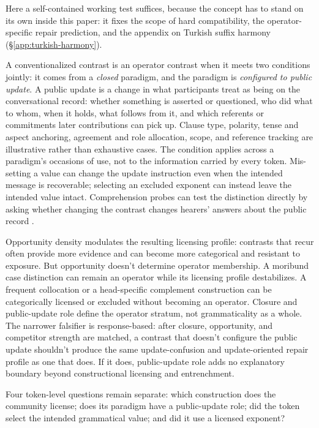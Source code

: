 \documentclass[12pt,letterpaper]{article}
\begin{document}
Here a self-contained working test suffices, because the concept has to stand on its own inside this paper: it fixes the scope of hard compatibility, the operator-specific repair prediction, and the appendix on Turkish suffix harmony (\S\ref{app:turkish-harmony}).

A conventionalized contrast is an operator contrast when it meets two
conditions jointly: it comes from a \emph{closed} paradigm, and the paradigm is \emph{configured to
public update}. A public update is a change in what participants treat as being
on the conversational record: whether something is asserted or questioned, who
did what to whom, when it holds, what follows from it, and which referents or
commitments later contributions can pick up. Clause type, polarity, tense and
aspect anchoring, agreement and role allocation, scope, and reference tracking
are illustrative rather than exhaustive cases. The condition applies across a
paradigm's occasions of use, not to the information carried by every token.
Mis-setting a value can change the update instruction even when the intended
message is recoverable; selecting an excluded exponent can instead leave the
intended value intact. Comprehension probes can test the distinction directly by
asking whether changing the contrast changes hearers' answers about the public
record \autocite{reynolds2026operators}.

Opportunity density modulates the resulting licensing profile: contrasts that
recur often provide more evidence and can become more categorical and resistant
to exposure. But opportunity doesn't determine operator membership. A moribund
case distinction can remain an operator while its licensing profile
destabilizes. A frequent collocation or a head-specific complement construction
can be categorically licensed or excluded without becoming an operator. Closure
and public-update role define the operator stratum, not grammaticality as a
whole. The narrower falsifier is response-based: after closure, opportunity,
and competitor strength are matched, a contrast that doesn't configure the
public update shouldn't produce the same update-confusion and update-oriented
repair profile as one that does. If it does, public-update role adds no
explanatory boundary beyond constructional licensing and entrenchment.

{\sloppy Four token-level questions remain separate: which construction does the community license; does its paradigm have a public-update role; did the token select the intended grammatical value; and did it use a licensed exponent?\par}
\end{document}
